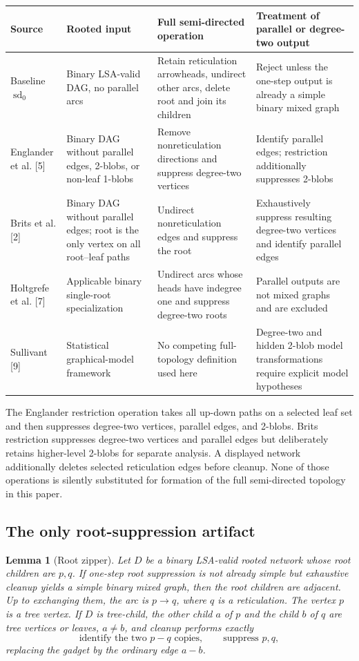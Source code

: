 \documentclass[11pt]{article}
\newtheorem{lemma}[theorem]{Lemma}
\theoremstyle{remark}\newtheorem{remark}[theorem]{Remark}
\begin{document}
\begin{longtable}{p{.15\linewidth}p{.22\linewidth}p{.25\linewidth}p{.27\linewidth}}
\toprule
Source & Rooted input & Full semi-directed operation & Treatment of parallel or degree-two output\\
\midrule\endhead
Baseline $\operatorname{sd}_0$ & Binary LSA-valid DAG, no parallel arcs & Retain reticulation arrowheads, undirect other arcs, delete root and join its children & Reject unless the one-step output is already a simple binary mixed graph\\
Englander et al. [5] & Binary DAG without parallel edges, 2-blobs, or non-leaf 1-blobs & Remove nonreticulation directions and suppress degree-two vertices & Identify parallel edges; restriction additionally suppresses 2-blobs\\
Brits et al. [2] & Binary DAG without parallel edges; root is the only vertex on all root--leaf paths & Undirect nonreticulation edges and suppress the root & Exhaustively suppress resulting degree-two vertices and identify parallel edges\\
Holtgrefe et al. [7] & Applicable binary single-root specialization & Undirect arcs whose heads have indegree one and suppress degree-two roots & Parallel outputs are not mixed graphs and are excluded\\
Sullivant [9] & Statistical graphical-model framework & No competing full-topology definition used here & Degree-two and hidden 2-blob model transformations require explicit model hypotheses\\
\bottomrule
\end{longtable}

The Englander restriction operation takes all up-down paths on a selected leaf set and then suppresses degree-two vertices, parallel edges, and 2-blobs.  Brits restriction suppresses degree-two vertices and parallel edges but deliberately retains higher-level 2-blobs for separate analysis.  A displayed network additionally deletes selected reticulation edges before cleanup.  None of those operations is silently substituted for formation of the full semi-directed topology in this paper.

\subsection{The only root-suppression artifact}
\begin{lemma}[Root zipper]\label{lem:zipper}
Let $D$ be a binary LSA-valid rooted network whose root children are $p,q$.  If one-step root suppression is not already simple but exhaustive cleanup yields a simple binary mixed graph, then the root children are adjacent.  Up to exchanging them, the arc is $p\to q$, where $q$ is a reticulation.  The vertex $p$ is a tree vertex.  If $D$ is tree-child, the other child $a$ of $p$ and the child $b$ of $q$ are tree vertices or leaves, $a\ne b$, and cleanup performs exactly
\[
\text{identify the two }p\!-
q\text{ copies},\qquad
\text{suppress }p,q,
\]
replacing the gadget by the ordinary edge $a-b$.
\end{lemma}
\end{document}
